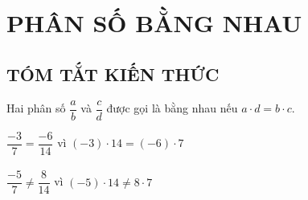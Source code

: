 \section{PHÂN SỐ BẰNG NHAU}
\subsection{TÓM TẮT KIẾN THỨC}
\begin{tomtat}

Hai phân số $\dfrac{a}{b}$ và $\dfrac{c}{d}$ được gọi là bằng nhau nếu $a\cdot d = b \cdot c$.\\
\begin{vd}
$\dfrac{-3}{7}=\dfrac{-6}{14}$ vì $(-3)\cdot 14 = (-6)\cdot 7$\\
\\
$\dfrac{-5}{7} \neq \dfrac{8}{14}$ vì $(-5)\cdot 14 \neq 8\cdot 7$
\end{vd}

\end{tomtat}
